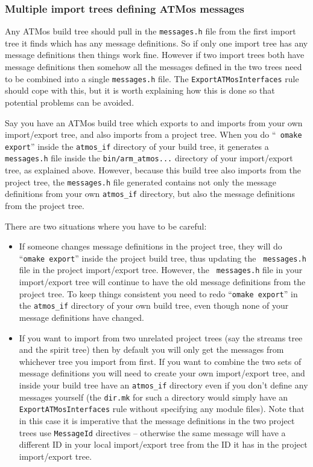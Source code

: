 \documentclass[11pt,twoside,onecolumn]{article}
\begin{document}
\subsubsection{Multiple import trees defining ATMos messages}

Any ATMos build tree should pull in the \verb|messages.h| file from the first
import tree it finds which has any message definitions.  So if only one import
tree has any message definitions then things work fine.  However if two import
trees both have message definitions then somehow all the messages defined in
the two trees need to be combined into a single \verb|messages.h| file.  The
{\tt ExportATMosInterfaces} rule should cope with this, but it is worth
explaining how this is done so that potential problems can be avoided.

Say you have an ATMos build tree which exports to and imports from your own
import/export tree, and also imports from a project tree.  When you do ``{\tt
omake export}'' inside the \verb|atmos_if| directory of your build tree, it
generates a {\tt messages.h} file inside the \verb|bin/arm_atmos...| directory
of your import/export tree, as explained above.  However, because this build
tree also imports from the project tree, the {\tt messages.h} file generated
contains not only the message definitions from your own \verb|atmos_if|
directory, but also the message definitions from the project tree.

There are two situations where you have to be careful:

\begin{itemize}

\item If someone changes message definitions in the project tree, they will do
``{\tt omake export}'' inside the project build tree, thus updating the {\tt
messages.h} file in the project import/export tree.  However, the {\tt
messages.h} file in your import/export tree will continue to have the old
message definitions from the project tree.  To keep things consistent you need
to redo ``{\tt omake export}'' in the \verb|atmos_if| directory of your own
build tree, even though none of your message definitions have changed.

\item If you want to import from two unrelated project trees (say the streams
tree and the spirit tree) then by default you will only get the messages from
whichever tree you import from first.  If you want to combine the two sets of
message definitions you will need to create your own import/export tree, and
inside your build tree have an \verb|atmos_if| directory even if you don't
define any messages yourself (the {\tt dir.mk} for such a directory would
simply have an {\tt ExportATMosInterfaces} rule without specifying any module
files).  Note that in this case it is imperative that the message definitions
in the two project trees use {\tt MessageId} directives -- otherwise the same
message will have a different ID in your local import/export tree from the ID
it has in the project import/export tree.

\end{itemize}
\end{document}
